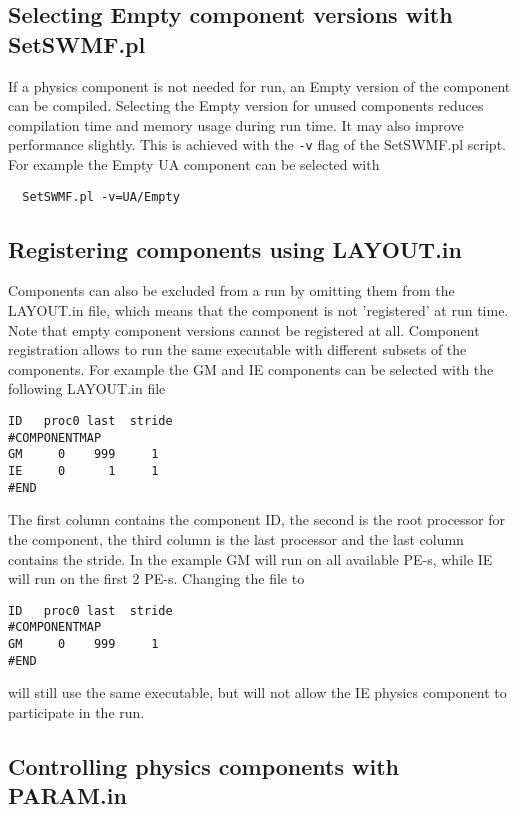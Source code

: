 \subsection{Selecting Empty component versions with SetSWMF.pl}

If a physics component is not needed for run, an Empty version of the
component can be compiled.
Selecting the Empty version for unused components reduces
compilation time and memory usage during run time.
It may also improve performance slightly.
This is achieved with the {\tt -v} flag of the SetSWMF.pl script. 
For example the Empty UA component can be selected with
\begin{verbatim}
  SetSWMF.pl -v=UA/Empty
\end{verbatim}

\subsection{Registering components using LAYOUT.in}

Components can also be excluded from a run by omitting them from the LAYOUT.in 
file, which means that the component is not 'registered' at run time.
Note that empty component versions cannot be registered at all.
Component registration allows to run the same executable with different 
subsets of the components. For example the GM and IE components 
can be selected with the following LAYOUT.in file
\begin{verbatim}
ID   proc0 last  stride
#COMPONENTMAP
GM     0    999     1
IE     0      1     1
#END
\end{verbatim}
The first column contains the component ID, the second is the
root processor for the component, the third column is the
last processor and the last column contains the stride.
In the example GM will run on all available PE-s, while IE
will run on the first 2 PE-s.  Changing the file to
\begin{verbatim}
ID   proc0 last  stride
#COMPONENTMAP
GM     0    999     1
#END
\end{verbatim}
will still use the same executable, but will not allow the IE 
physics component to participate in the run.

\subsection{Controlling physics components with PARAM.in}

